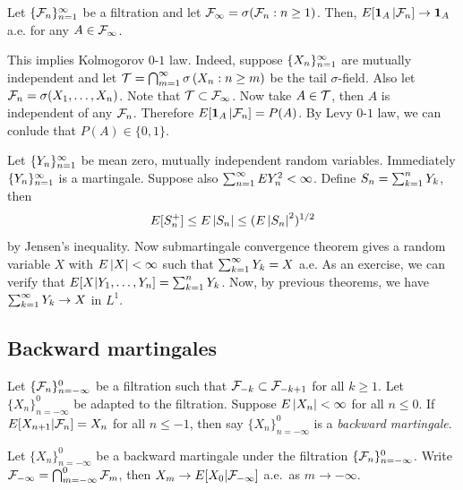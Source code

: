 \documentclass[a4paper]{article}
\begin{document}
\begin{cor}
  Let $\{ \mathcal{F}_n \}_{n=1}^\infty$ be a filtration and let $\mathcal{F}_\infty
    = \sigma (\mathcal{F}_n : n \geq 1)$.
  Then, $E [\operatorname{\mathbf{1}}_A | \mathcal{F}_n] \to \operatorname{\mathbf{1}}_A$ a.e. for any $A \in \mathcal{F}_\infty$.
\end{cor}

\begin{remark}
  This implies Kolmogorov $0$-$1$ law. Indeed, suppose
  $\{ X_n \}_{n=1}^\infty$ are mutually independent and let $\mathcal{T} =
    \bigcap_{m=1}^\infty \sigma \left( X_n : n \geq m \right)$
  be the tail $\sigma$-field. Also let $\mathcal{F}_n =
    \sigma (X_1, \dots, X_n)$. Note that
  $\mathcal{T} \subset \mathcal{F}_\infty$.
  Now take $A \in \mathcal{T}$, then
  $A$ is independent of any $\mathcal{F}_n$. Therefore
  $E [\operatorname{\mathbf{1}}_A | \mathcal{F}_n] = P(A)$. By Levy $0$-$1$ law,
  we can conlude that $P(A) \in \{ 0, 1 \}$.
\end{remark}

\begin{eg}
  Let $\{ Y_n \}_{n=1}^\infty$ be mean zero, mutually independent
  random variables. Immediately $\{ Y_n \}_{n=1}^\infty$ is a martingale.
  Suppose also $\sum_{n=1}^\infty E Y_n^2 < \infty$.
  Define $S_n = \sum_{k=1}^n Y_k$, then
  \[
    E [S_n^+] \leq E \left\lvert S_n\right\rvert \leq ( E \left\lvert S_n\right\rvert^2 )^{1/2}
  \]
  by Jensen's inequality. Now submartingale convergence theorem
  gives a random variable $X$ with
  $E \left\lvert X\right\rvert < \infty$ such that $\sum_{k=1}^\infty Y_k = X$ a.e.
  As an exercise, we can verify that
  $E [X | Y_1, \dots, Y_n] = \sum_{k=1}^n Y_k$.
  Now, by previous theorems, we have $\sum_{k=1}^\infty Y_k \to X$ in $L^1$.
\end{eg}

\subsection{Backward martingales}

\begin{defi}
  Let $\{\mathcal{F}_n\}_{n = -\infty}^0$ be a filtration
  such that $\mathcal{F}_{-k} \subset \mathcal{F}_{-k+1}$ for all $k \geq 1$.
  Let $\{X_n\}_{n = -\infty}^0$ be adapted to the filtration.
  Suppose $E \left\lvert X_n\right\rvert < \infty$ for all $n \leq 0$.
  If $E [X_{n + 1} | \mathcal{F}_n] = X_n$ for all $n \leq -1$,
  then say $\{X_n\}_{n = -\infty}^0$ is a \emph{backward martingale}.
\end{defi}

\begin{thm}
  Let $\{X_n\}_{n = -\infty}^0$ be a backward martingale
  under the filtration $\{\mathcal{F}_n\}_{n = -\infty}^0$.
  Write $\mathcal{F}_{-\infty} = \bigcap_{m = -\infty}^0 \mathcal{F}_m$,
  then $X_m \to E[X_0 | \mathcal{F}_{-\infty}]$ a.e.\ as $m \to -\infty$.
\end{thm}
\end{document}
